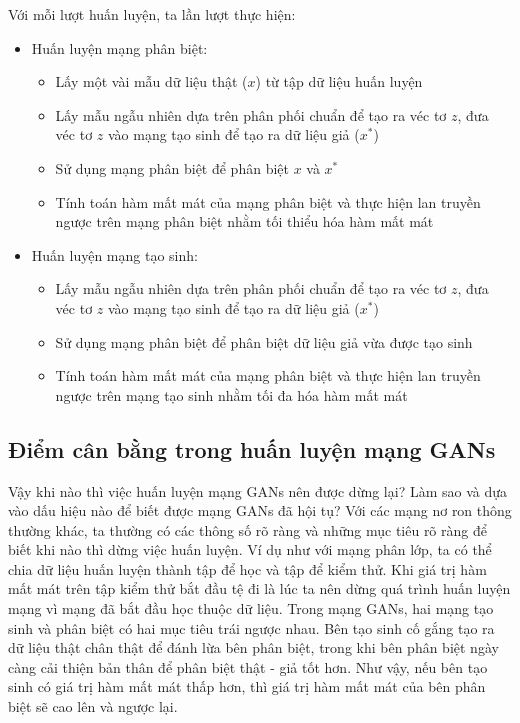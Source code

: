 Với mỗi lượt huấn luyện, ta lần lượt thực hiện:
\begin{itemize}
    \item Huấn luyện mạng phân biệt:
    \begin{itemize}
        \item Lấy một vài mẫu dữ liệu thật ($x$) từ tập dữ liệu huấn luyện
        \item Lấy mẫu ngẫu nhiên dựa trên phân phối chuẩn để tạo ra véc tơ $z$, đưa véc tơ $z$ vào mạng tạo sinh để tạo ra dữ liệu giả ($x^*$)
        \item Sử dụng mạng phân biệt để phân biệt $x$ và $x^*$
        \item Tính toán hàm mất mát của mạng phân biệt và thực hiện lan truyền ngược trên mạng phân biệt nhằm tối thiểu hóa hàm mất mát
    \end{itemize}

    \item Huấn luyện mạng tạo sinh:
    \begin{itemize}
        \item Lấy mẫu ngẫu nhiên dựa trên phân phối chuẩn để tạo ra véc tơ $z$, đưa véc tơ $z$ vào mạng tạo sinh để tạo ra dữ liệu giả ($x^*$)
        \item Sử dụng mạng phân biệt để phân biệt dữ liệu giả vừa được tạo sinh
        \item Tính toán hàm mất mát của mạng phân biệt và thực hiện lan truyền ngược trên mạng tạo sinh nhằm tối đa hóa hàm mất mát
    \end{itemize}
\end{itemize}

\subsection{Điểm cân bằng trong huấn luyện mạng GANs}

Vậy khi nào thì việc huấn luyện mạng GANs nên được dừng lại? Làm sao và dựa vào dấu hiệu nào để biết được mạng GANs đã hội tụ? Với các mạng nơ ron thông thường khác, ta thường có các thông số rõ ràng và những mục tiêu rõ ràng để biết khi nào thì dừng việc huấn luyện. Ví dụ như với mạng phân lớp, ta có thể chia dữ liệu huấn luyện thành tập để học và tập để kiểm thử. Khi giá trị hàm mất mát trên tập kiểm thử bắt đầu tệ đi là lúc ta nên dừng quá trình huấn luyện mạng vì mạng đã bắt đầu học thuộc dữ liệu. Trong mạng GANs, hai mạng tạo sinh và phân biệt có hai mục tiêu trái ngược nhau. Bên tạo sinh cố gắng tạo ra dữ liệu thật chân thật để đánh lừa bên phân biệt, trong khi bên phân biệt ngày càng cải thiện bản thân để phân biệt thật - giả tốt hơn. Như vậy, nếu bên tạo sinh có giá trị hàm mất mát thấp hơn, thì giá trị hàm mất mát của bên phân biệt sẽ cao lên và ngược lại.

